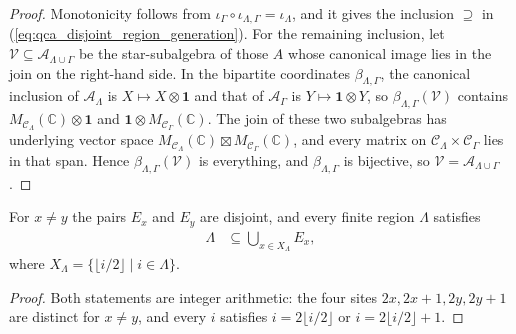 \begin{proof}\leanok
    Monotonicity follows from
    $\iota_\Gamma\circ\iota_{\Lambda,\Gamma}=\iota_\Lambda$, and it gives the
    inclusion $\supseteq$ in
    (\ref{eq:qca_disjoint_region_generation}).  For the remaining inclusion,
    let $\mathcal V\subseteq\mathcal A_{\Lambda\cup\Gamma}$ be the
    star-subalgebra of those $A$ whose canonical image lies in the join on the
    right-hand side.  In the bipartite coordinates
    $\beta_{\Lambda,\Gamma}$, the canonical inclusion of
    $\mathcal A_\Lambda$ is $X\mapsto X\otimes\mathbf 1$ and that of
    $\mathcal A_\Gamma$ is $Y\mapsto\mathbf 1\otimes Y$, so
    $\beta_{\Lambda,\Gamma}(\mathcal V)$ contains
    $M_{\mathcal C_\Lambda}(\mathbb C)\otimes\mathbf 1$ and
    $\mathbf 1\otimes M_{\mathcal C_\Gamma}(\mathbb C)$.  The join of these two
    subalgebras has underlying vector space
    $M_{\mathcal C_\Lambda}(\mathbb C)\boxtimes
        M_{\mathcal C_\Gamma}(\mathbb C)$, and every matrix on
    $\mathcal C_\Lambda\times\mathcal C_\Gamma$ lies in that span.  Hence
    $\beta_{\Lambda,\Gamma}(\mathcal V)$ is everything, and
    $\beta_{\Lambda,\Gamma}$ is bijective, so
    $\mathcal V=\mathcal A_{\Lambda\cup\Gamma}$.
\end{proof}

\begin{lemma}
    \label{lem:qca_even_pair_cover}
    \leanok
    For $x\ne y$ the pairs $E_x$ and $E_y$ are disjoint, and every finite
    region $\Lambda$ satisfies
    \begin{align}
        \Lambda & \subseteq\bigcup_{x\in X_\Lambda}E_x,
        \label{eq:qca_even_pair_cover}
    \end{align}
    where $X_\Lambda=\{\lfloor i/2\rfloor\mid i\in\Lambda\}$.
\end{lemma}

\begin{proof}\leanok
    Both statements are integer arithmetic: the four sites
    $2x,2x+1,2y,2y+1$ are distinct for $x\ne y$, and every $i$ satisfies
    $i=2\lfloor i/2\rfloor$ or $i=2\lfloor i/2\rfloor+1$.
\end{proof}


